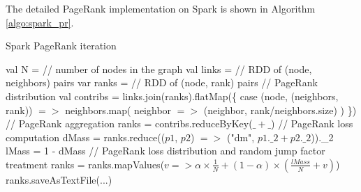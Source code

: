 \documentclass[12pt,conference,letterpaper]{IEEEtran}
\begin{document}



The detailed PageRank implementation on Spark is shown in Algorithm \ref{algo:spark_pr}.

\begin{algorithm}[!t]
\caption{Spark PageRank iteration}
\label{algo:spark_pr}
\begin{algorithmic}
\STATE val N = // number of nodes in the graph
\STATE val links =  // RDD of (node, neighbors) pairs
\STATE var ranks =  // RDD of (node, rank) pairs
\STATE // PageRank distribution
\STATE val contribs = links.join(ranks).flatMap(\{
  \STATE case (node, (neighbors, rank)) $=>$ 
  \STATE neighbors.map(
    \STATE neighbor $=>$ (neighbor, rank/neighbors.size)
    \STATE )
\STATE \})
\STATE // PageRank aggregation
\STATE ranks = contribs.reduceByKey($\_ + \_$)
\STATE // PageRank loss computation
\STATE dMass = ranks.reduce(($p1$, $p2$) $=>$ ("dm", $p1.\_2 + p2.\_2$)).\_2
\STATE lMass = 1 - dMass
\STATE // PageRank loss distribution and random jump factor treatment
\STATE ranks = ranks.mapValues($v => \alpha\times\frac{1}{N} + (1 - \alpha) \times (\frac{lMass}{N} + v)$)
\ENDFOR 
\STATE ranks.saveAsTextFile(...)
\end{algorithmic}
\end{algorithm}




\end{document}
